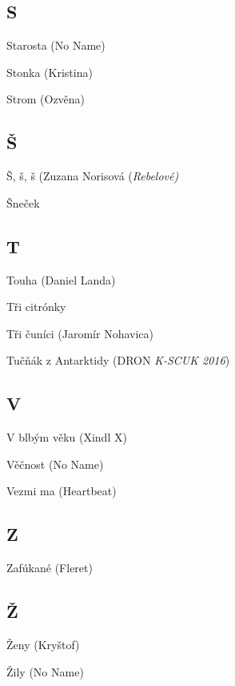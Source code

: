 \newpage


\subsection*{S}
Starosta (No Name)

Stonka (Kristina)

Strom (Ozvěna)

\subsection*{Š}
Š, š, š (Zuzana Norisová (\emph{Rebelové)}

Šneček

\subsection*{T}
Touha (Daniel Landa)

Tři citrónky

Tři čuníci (Jaromír Nohavica)

Tučňák z Antarktidy (DRON \emph{K-SCUK 2016})

\subsection*{V}
V blbým věku (Xindl X)

Věčnost (No Name)

Vezmi ma (Heartbeat)

\subsection*{Z}
Zafúkané (Fleret)

\subsection*{Ž}
Ženy (Kryštof)

Žily (No Name)

\newpage
